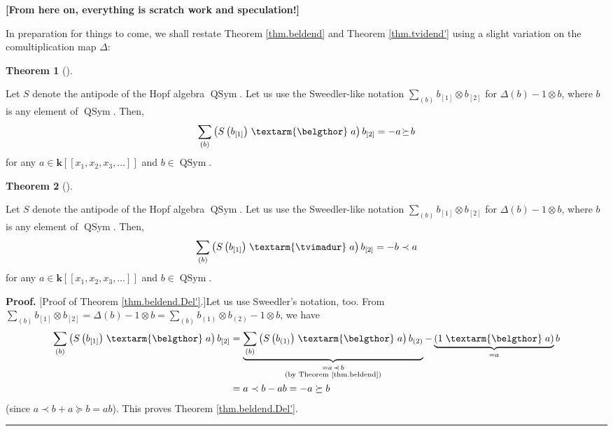 \documentclass[numbers=enddot,12pt,final,onecolumn,notitlepage]{scrartcl}%
\theoremstyle{definition}
\newtheorem{theo}{Theorem}[section]
\newenvironment{theorem}[1][]
{\begin{theo}[#1]\begin{leftbar}}
{\end{leftbar}\end{theo}}
\newenvironment{proof}[1][Proof]{\noindent\textbf{#1.} }{\ \rule{0.5em}{0.5em}}
\newenvironment{noncompile}{}{}
\newcommand{\tvi}{\left. \textarm{\tvimadur} \right.}
\newcommand{\bel}{\left. \textarm{\belgthor} \right.}
\let\sumnonlimits\sum
\renewcommand{\sum}{\sumnonlimits\limits}
\begin{document}
\begin{noncompile}
\textbf{[From here on, everything is scratch work and speculation!]}

In preparation for things to come, we shall restate Theorem \ref{thm.beldend}
and Theorem \ref{thm.tvidend'} using a slight variation on the
comultiplication map $\Delta$:

\begin{theorem}
\label{thm.beldend.Del'}Let $S$ denote the antipode of the Hopf algebra
$\operatorname*{QSym}$. Let us use the Sweedler-like notation $\sum_{\left(
b\right)  }b_{\left[  1\right]  }\otimes b_{\left[  2\right]  }$ for
$\Delta\left(  b\right)  -1\otimes b$, where $b$ is any element of
$\operatorname*{QSym}$. Then,%
\[
\sum_{\left(  b\right)  }\left(  S\left(  b_{\left[  1\right]  }\right)
\bel
a\right)  b_{\left[  2\right]  }=-a\mathfrak{\left.  \succeq\right.  }b
\]
for any $a\in\mathbf{k}\left[  \left[  x_{1},x_{2},x_{3},\ldots\right]
\right]  $ and $b\in\operatorname*{QSym}$.
\end{theorem}

\begin{theorem}
\label{thm.tvidend'.Del'}Let $S$ denote the antipode of the Hopf algebra
$\operatorname*{QSym}$. Let us use the Sweedler-like notation $\sum_{\left(
b\right)  }b_{\left[  1\right]  }\otimes b_{\left[  2\right]  }$ for
$\Delta\left(  b\right)  -1\otimes b$, where $b$ is any element of
$\operatorname*{QSym}$. Then,%
\[
\sum_{\left(  b\right)  }\left(  S\left(  b_{\left[  1\right]  }\right)
\tvi
a\right)  b_{\left[  2\right]  }=-b\left.  \prec\right.  a
\]
for any $a\in\mathbf{k}\left[  \left[  x_{1},x_{2},x_{3},\ldots\right]
\right]  $ and $b\in\operatorname*{QSym}$.
\end{theorem}

\begin{proof}
[Proof of Theorem \ref{thm.beldend.Del'}.]Let us use Sweedler's notation, too.
From $\sum_{\left(  b\right)  }b_{\left[  1\right]  }\otimes b_{\left[
2\right]  }=\Delta\left(  b\right)  -1\otimes b=\sum_{\left(  b\right)
}b_{\left(  1\right)  }\otimes b_{\left(  2\right)  }-1\otimes b$, we have%
\begin{align*}
\sum_{\left(  b\right)  }\left(  S\left(  b_{\left[  1\right]  }\right)
\bel a\right)  b_{\left[  2\right]  }  &  =\underbrace{\sum_{\left(  b\right)
}\left(  S\left(  b_{\left(  1\right)  }\right)  \bel a\right)  b_{\left(
2\right)  }}_{\substack{=a\left.  \prec\right.  b\\\text{(by Theorem
\ref{thm.beldend})}}}-\underbrace{\left(  1\bel a\right)  }_{=a}b\\
&  =a\left.  \prec\right.  b-ab=-a\left.  \succeq\right.  b
\end{align*}
(since $a\left.  \prec\right.  b+a\left.  \succeq\right.  b=ab$). This proves
Theorem \ref{thm.beldend.Del'}.
\end{proof}


\end{noncompile}
\end{document}
